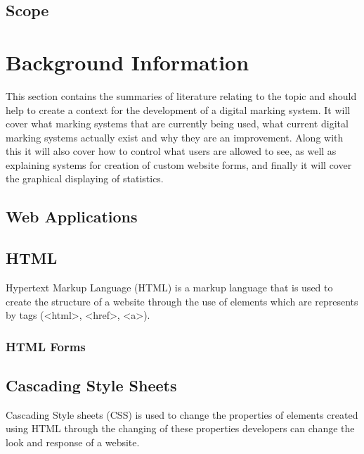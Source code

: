 \documentclass[12pt]{article}  %
\begin{document}
\subsection{Scope}





\newpage
\section{Background Information}
This section contains the summaries of literature relating to the topic and should help to create a context for the development of a digital marking system. It will cover what marking systems that are currently being used, what current digital marking systems actually exist and why they are an improvement. Along with this it will also cover how to control what users are allowed to see, as well as explaining systems for creation of custom website forms, and finally it will cover the graphical displaying of statistics. 


\subsection{Web Applications}

\subsection{HTML}
Hypertext Markup Language (HTML) is a markup language that is used to create the structure of a website through the use of elements which are represents by tags (\textless html\textgreater, \textless href\textgreater, \textless a\textgreater). 

\subsubsection{HTML Forms}



\subsection{Cascading Style Sheets}
Cascading Style sheets (CSS) is used to change the properties of elements created using HTML through the changing of these properties developers can change the look and response of a website. 
\end{document}
